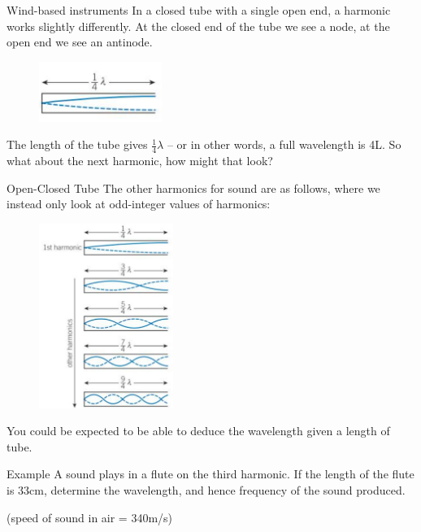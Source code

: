 \documentclass[../Main.tex]{subfiles}
\begin{document}
\begin{frame}{Wind-based instruments}
    In a closed tube with a single open end, a harmonic works slightly differently. At the closed end of the tube we see a node, at the open end we see an antinode.
    
    \begin{figure}
        \centering
        \includegraphics[width=4cm]{Waves_Images/open-closed_firstharmonic.jpg}
    \end{figure}
    The length of the tube gives $\frac{1}{4}\lambda$ -- or in other words, a full wavelength is 4L. 
    \pause
    \newline
    So what about the next harmonic, how might that look?
\end{frame}

\begin{frame}{Open-Closed Tube}
    The other harmonics for sound are as follows, where we instead only look at odd-integer values of harmonics:
    \begin{multicols}{2}
    \begin{figure}
        \centering
        \includegraphics[height=6cm]{Waves_Images/open-closed_harmonics.jpg}
    \end{figure}
    \columnbreak
    You could be expected to be able to deduce the wavelength given a length of tube.
    
    \begin{minipage}{5.5cm}
    \begin{exampleblock}{Example}
    A sound plays in a flute on the third harmonic. If the length of the flute is 33cm, determine the wavelength, and hence frequency of the sound produced.
    \end{exampleblock}
    (speed of sound in air = 340m/s)
    \end{minipage}
    \end{multicols}
\end{frame}
\end{document}
